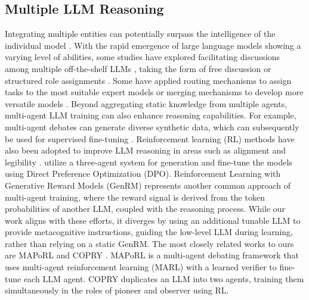 \subsection{Multiple LLM Reasoning}
\label{related_work:multi_llm}
Integrating multiple entities can potentially surpass the intelligence of the individual model \citep{chen2023agentverse}. With the rapid emergence of large language models showing a varying level of abilities, some studies have explored facilitating discussions among multiple off-the-shelf LLMs \citep{zhang2025if,chen2024s,wang2023unleashing,du2023improving,zhuge2023mindstorms,tang2023medagents,hao2025chatllm,akata2023playing,hong2023metagpt,zhang2024aflow}, taking the form of free discussion \citep{du2023improving,liang2023encouraging} or structured role assignments \citep{hong2023metagpt,zhang2024aflow}. Some have applied routing mechanisms to assign tasks to the most suitable expert models \citep{hu2024routerbench,stripelis2024tensoropera,ding2024hybrid,yue2025masrouter,chen2024routerdc} or merging mechanisms to develop more versatile models \citep{yadav2024matters,yu2024language,zhang2025nature}. Beyond aggregating static knowledge from multiple agents, multi-agent LLM training can also enhance reasoning capabilities. For example, multi-agent debates can generate diverse synthetic data, which can subsequently be used for supervised fine-tuning \citep{estornell2024accdebateactorcriticapproachmultiagent,li2024can,motwani2024maltimprovingreasoningmultiagent,dong2025stpselfplayllmtheorem,perez2022red,ye2025emergence,subramaniam2025multiagentfinetuningselfimprovement}. Reinforcement learning (RL) methods have also been adopted to improve LLM reasoning in areas such as alignment \citep{perez2022red,ma2023red} and legibility \citep{kirchner2024prover}. \cite{motwani2024maltimprovingreasoningmultiagent} utilize a three-agent system for generation and fine-tune the models using Direct Preference Optimization (DPO). Reinforcement Learning with Generative Reward Models (GenRM) \citep{mahan2024generative,ye2025iterative,jiao2024preference,wang2024self} represents another common approach of multi-agent training, where the reward signal is derived from the token probabilities of another LLM, coupled with the reasoning process. While our work aligns with these efforts, it diverges by using an additional tunable LLM to provide metacognitive instructions, guiding the low-level LLM during learning, rather than relying on a static GenRM. The most closely related works to ours are MAPoRL \citep{park2025maporlmultiagentpostcotrainingcollaborative} and COPRY \citep{DBLP:journals/corr/abs-2410-06101}. MAPoRL is a multi-agent debating framework that uses multi-agent reinforcement learning (MARL) with a learned verifier to fine-tune each LLM agent. COPRY duplicates an LLM into two agents, training them simultaneously in the roles of pioneer and observer using RL. 
